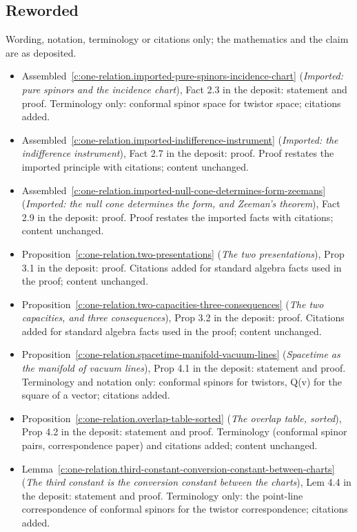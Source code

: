 \documentclass[11pt]{article}
\theoremstyle{definition}
\theoremstyle{plain}
\begin{document}
\subsection*{Reworded}
Wording, notation, terminology or citations only; the mathematics and the claim are as deposited.
\begin{itemize}\setlength{\itemsep}{2pt}
\item Assembled~\ref{c:one-relation.imported-pure-spinors-incidence-chart} (\emph{Imported: pure spinors and the incidence chart}), Fact 2.3 in the deposit: statement and proof. Terminology only: conformal spinor space for twistor space; citations added.
\item Assembled~\ref{c:one-relation.imported-indifference-instrument} (\emph{Imported: the indifference instrument}), Fact 2.7 in the deposit: proof. Proof restates the imported principle with citations; content unchanged.
\item Assembled~\ref{c:one-relation.imported-null-cone-determines-form-zeemans} (\emph{Imported: the null cone determines the form, and Zeeman's theorem}), Fact 2.9 in the deposit: proof. Proof restates the imported facts with citations; content unchanged.
\item Proposition~\ref{c:one-relation.two-presentations} (\emph{The two presentations}), Prop 3.1 in the deposit: proof. Citations added for standard algebra facts used in the proof; content unchanged.
\item Proposition~\ref{c:one-relation.two-capacities-three-consequences} (\emph{The two capacities, and three consequences}), Prop 3.2 in the deposit: proof. Citations added for standard algebra facts used in the proof; content unchanged.
\item Proposition~\ref{c:one-relation.spacetime-manifold-vacuum-lines} (\emph{Spacetime as the manifold of vacuum lines}), Prop 4.1 in the deposit: statement and proof. Terminology and notation only: conformal spinors for twistors, Q(v) for the square of a vector; citations added.
\item Proposition~\ref{c:one-relation.overlap-table-sorted} (\emph{The overlap table, sorted}), Prop 4.2 in the deposit: statement and proof. Terminology (conformal spinor pairs, correspondence paper) and citations added; content unchanged.
\item Lemma~\ref{c:one-relation.third-constant-conversion-constant-between-charts} (\emph{The third constant is the conversion constant between the charts}), Lem 4.4 in the deposit: statement and proof. Terminology only: the point-line correspondence of conformal spinors for the twistor correspondence; citations added.

\end{itemize}
\end{document}
